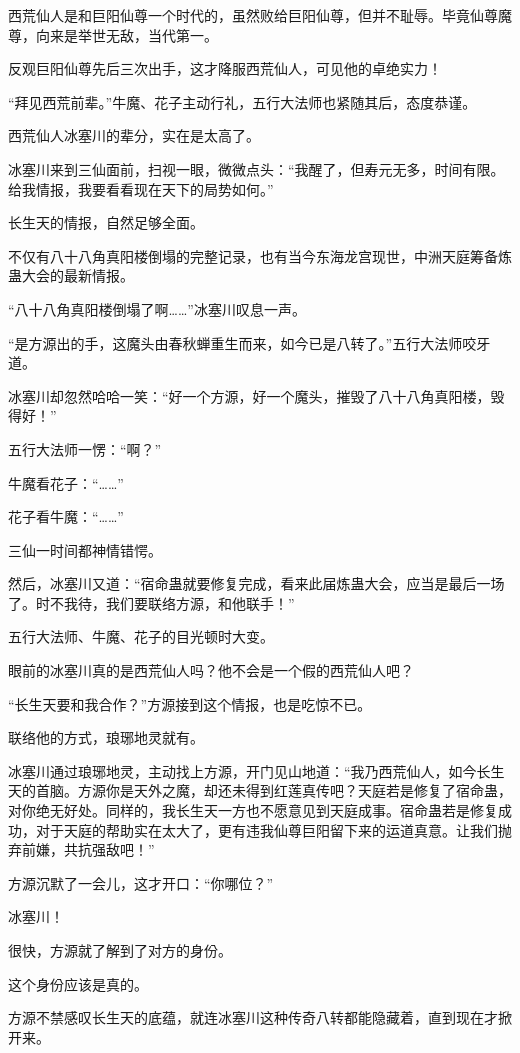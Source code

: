 \begin{this_body}
西荒仙人是和巨阳仙尊一个时代的，虽然败给巨阳仙尊，但并不耻辱。毕竟仙尊魔尊，向来是举世无敌，当代第一。

反观巨阳仙尊先后三次出手，这才降服西荒仙人，可见他的卓绝实力！

“拜见西荒前辈。”牛魔、花子主动行礼，五行大法师也紧随其后，态度恭谨。

西荒仙人冰塞川的辈分，实在是太高了。

冰塞川来到三仙面前，扫视一眼，微微点头：“我醒了，但寿元无多，时间有限。给我情报，我要看看现在天下的局势如何。”

长生天的情报，自然足够全面。

不仅有八十八角真阳楼倒塌的完整记录，也有当今东海龙宫现世，中洲天庭筹备炼蛊大会的最新情报。

“八十八角真阳楼倒塌了啊……”冰塞川叹息一声。

“是方源出的手，这魔头由春秋蝉重生而来，如今已是八转了。”五行大法师咬牙道。

冰塞川却忽然哈哈一笑：“好一个方源，好一个魔头，摧毁了八十八角真阳楼，毁得好！”

五行大法师一愣：“啊？”

牛魔看花子：“……”

花子看牛魔：“……”

三仙一时间都神情错愕。

然后，冰塞川又道：“宿命蛊就要修复完成，看来此届炼蛊大会，应当是最后一场了。时不我待，我们要联络方源，和他联手！”

五行大法师、牛魔、花子的目光顿时大变。

眼前的冰塞川真的是西荒仙人吗？他不会是一个假的西荒仙人吧？

“长生天要和我合作？”方源接到这个情报，也是吃惊不已。

联络他的方式，琅琊地灵就有。

冰塞川通过琅琊地灵，主动找上方源，开门见山地道：“我乃西荒仙人，如今长生天的首脑。方源你是天外之魔，却还未得到红莲真传吧？天庭若是修复了宿命蛊，对你绝无好处。同样的，我长生天一方也不愿意见到天庭成事。宿命蛊若是修复成功，对于天庭的帮助实在太大了，更有违我仙尊巨阳留下来的运道真意。让我们抛弃前嫌，共抗强敌吧！”

方源沉默了一会儿，这才开口：“你哪位？”

冰塞川！

很快，方源就了解到了对方的身份。

这个身份应该是真的。

方源不禁感叹长生天的底蕴，就连冰塞川这种传奇八转都能隐藏着，直到现在才掀开来。


\end{this_body}
